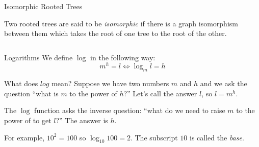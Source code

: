 \begin{frame}[fragile]{Isomorphic Rooted Trees}
  \begin{definition}
   Two rooted trees are said to be \emph{isomorphic} if there is a graph isomorphism between them which takes the root of one tree to the root of the other.
  \end{definition}
  \vspace{5mm}
  \begin{columns}
    \begin{column}{0.4\textwidth}
      \begin{center}
      \end{center}
    \end{column}
    \begin{column}{0.4\textwidth}
      \begin{center}
      \end{center}
    \end{column}
  \end{columns}
\end{frame}

\begin{frame}{Logarithms}
  We define $\log$ in the following way:
  \[ m^h = l \Leftrightarrow \log_m l = h \]

  \begin{alertblock}{What does $log$ mean?}
    Suppose we have two numbers $m$ and $h$ and we ask the question ``what is $m$ to the power of $h$?''
    Let's call the answer $l$, so $l = m^h$.

    The $\log$ function asks the inverse question: ``what do we need to raise $m$ to the power of to get $l$?''
    The answer is $h$.

    For example, $10^2 = 100$ so $\log_{10} 100 = 2$.
    The subscript $10$ is called the \emph{base}.
  \end{alertblock}
\end{frame}


